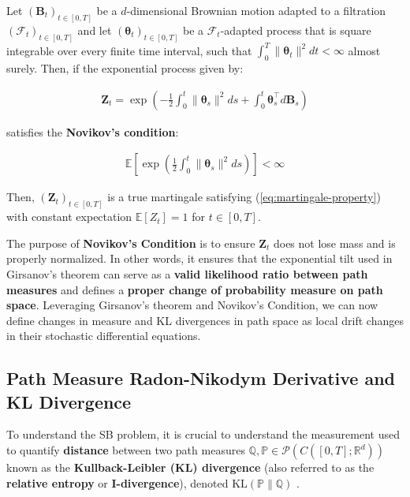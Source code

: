 \documentclass{article}
\newcommand{\boldtext}[1]{\textbf{\textcolor{MyGreen}{#1}}}
\begin{document}
\begin{lemma}\label{lemma:novikov-condition}
    Let $(\boldsymbol{B}_t)_{t\in [0,T]}$ be a $d$-dimensional Brownian motion adapted to a filtration $(\mathcal{F}_t)_{t\in [0,T]}$ and let $(\boldsymbol{\theta}_t)_{t\in [0,T]}$ be a $\mathcal{F}_t$-adapted process that is square integrable over every finite time interval, such that  $\int_0^T\|\boldsymbol{\theta}_t\|^2dt< \infty$ almost surely. Then, if the exponential process given by:
    \begin{small}
    \begin{align}
        \boldsymbol{Z}_t=\exp\left(-\frac{1}{2}\int_0^t\|\boldsymbol{\theta}_s\|^2ds+\int_0^t\boldsymbol{\theta}_s^\top d\boldsymbol{B}_s\right) 
    \end{align}
    \end{small}
    satisfies the \textbf{Novikov's condition}:
    \begin{small}
    \begin{align}
        \mathbb{E}\left[\exp\left(\frac{1}{2}\int_0^t\|\boldsymbol{\theta}_s\|^2ds\right) \right]< \infty\tag{Novikov's condition}\label{eq:novikov-condition}
    \end{align}
    \end{small}
    Then, $(\boldsymbol{Z}_t)_{t\in [0,T]}$ is a true martingale satisfying (\ref{eq:martingale-property}) with constant expectation $\mathbb{E}[Z_t]=1$ for $t\in [0,T]$.
\end{lemma}

The purpose of \textbf{Novikov’s Condition} is to ensure $\boldsymbol{Z}_t$ does not lose mass and is properly normalized. In other words, it ensures that the exponential tilt used in Girsanov’s theorem can serve as a \textbf{valid likelihood ratio between path measures} and defines a \textbf{proper change of probability measure on path space}. Leveraging Girsanov's theorem and Novikov’s Condition, we can now define changes in measure and KL divergences in path space as local drift changes in their stochastic differential equations. 

\subsection{Path Measure Radon-Nikodym Derivative and KL Divergence}
\label{subsec:path-measure-rnd-kl}
To understand the SB problem, it is crucial to understand the measurement used to quantify \textbf{distance} between two path measures $\mathbb{Q}, \mathbb{P}\in  \mathcal{P}(C([0,T]; \mathbb{R}^d))$ known as the \boldtext{Kullback-Leibler (KL) divergence} (also referred to as the \textbf{relative entropy} or \textbf{I-divergence}), denoted $\text{KL}(\mathbb{P}\|\mathbb{Q})$ \citep{csiszar1975divergence}. 
\end{document}
